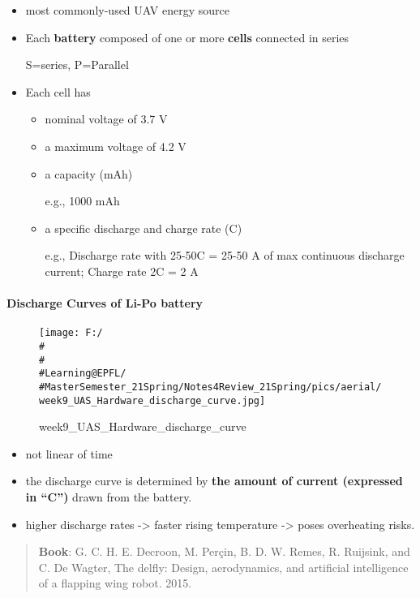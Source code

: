 \documentclass[]{article}
\let\oldparagraph\paragraph
\renewcommand{\paragraph}[1]{\oldparagraph{#1}\mbox{}}
\begin{document}
\begin{itemize}
\item
  most commonly-used UAV energy source
\item
  Each \textbf{battery} composed of one or more \textbf{cells} connected
  in series

  S=series, P=Parallel
\item
  Each cell has

  \begin{itemize}
  \item
    nominal voltage of 3.7 V
  \item
    a maximum voltage of 4.2 V
  \item
    a capacity (mAh)

    e.g., 1000 mAh
  \item
    a specific discharge and charge rate (C)

    e.g., Discharge rate with 25-50C = 25-50 A of max continuous
    discharge current; Charge rate 2C = 2 A
  \end{itemize}
\end{itemize}

\paragraph{Discharge Curves of Li-Po battery}\label{header-n1997}

\begin{figure}
\centering
\texttt{[image: F:/\\\#\\\#\\\#Learning@EPFL/\\\#MasterSemester\_21Spring/Notes4Review\_21Spring/pics/aerial/week9\_UAS\_Hardware\_discharge\_curve.jpg]}
\caption{week9\_UAS\_Hardware\_discharge\_curve}
\end{figure}

\begin{itemize}
\item
  not linear of time
\item
  the discharge curve is determined by \textbf{the amount of current
  (expressed in ``C'')} drawn from the battery.
\item
  higher discharge rates -\textgreater{} faster rising temperature
  -\textgreater{} poses overheating risks.
\end{itemize}

\begin{quote}
\textbf{Book}: G. C. H. E. Decroon, M. Perçin, B. D. W. Remes, R.
Ruijsink, and C. De Wagter, The delfly: Design, aerodynamics, and
artificial intelligence of a flapping wing robot. 2015.
\end{quote}
\end{document}
